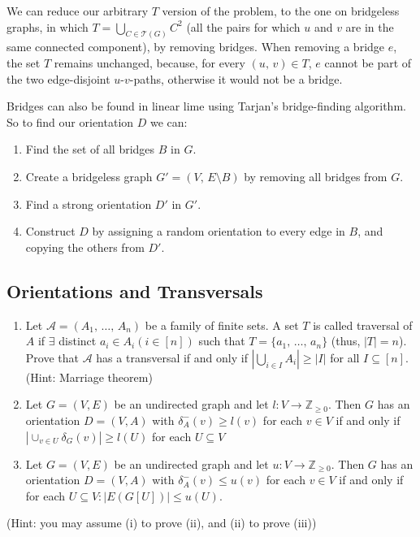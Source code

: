 \documentclass{article}
\newcommand{\Z}{\mathbb{Z}}
\begin{document}
  We can reduce our arbitrary $T$ version of the problem, to the one on bridgeless graphs,
  in which $T = \bigcup_{C \in \mathcal{T}(G)} C^2$ (all the pairs for which $u$ and $v$ are in the same connected component),
  by removing bridges.
  When removing a bridge $e$, the set $T$ remains unchanged,
  because, for every $(u,\, v) \in T$, $e$ cannot be part of the two edge-disjoint $u$-$v$-paths,
  otherwise it would not be a bridge.

  Bridges can also be found in linear lime using Tarjan's bridge-finding algorithm.
  So to find our orientation $D$ we can:
  \begin{enumerate}[itemsep=-1ex]
    \item Find the set of all bridges $B$ in $G$.
    \item Create a bridgeless graph $G' = (V,\, E \setminus B)$ by removing all bridges from $G$.
    \item Find a strong orientation $D'$ in $G'$.
    \item Construct $D$ by assigning a random orientation to every edge in $B$, and copying the others from $D'$.
  \end{enumerate}

  \subsection{Orientations and Transversals}
  \begin{centerframebox}
    \begin{enumerate}[label=(\roman*)]
      \item Let $\mathcal{A} = (A_1,\, \dots,\, A_n)$ be a family of finite sets. A set $T$ is
      called traversal of $A$ if $\exists$ distinct $a_i \in A_i (i \in [n])$ such that $T = \{a_1,\, \dots,\, a_n\}$
      (thus, $|T| = n$). Prove that $\mathcal{A}$ has a transversal if and only if $|\bigcup_{i\in I} A_i| \geq |I|$
      for all $I \subseteq [n]$. (Hint: Marriage theorem)

      \item Let $G = (V, E)$ be an undirected graph and let $l : V \to \Z_{\geq 0}$. Then $G$ has
      an orientation $D = (V, A)$ with $\delta^-_A(v) \geq l(v)$ for each $v \in V$ if and only if
      $|\cup_{v\in U} \delta_G(v)| \geq l(U)$ for each $U \subseteq V$

      \item Let $G = (V, E)$ be an undirected graph and let $u : V \to \Z_{\geq 0}$. Then $G$ has
      an orientation $D = (V, A)$ with $\delta^-_A(v) \leq u(v)$ for each $v \in V$ if and only if for each $U \subseteq V : |E(G[U])| \leq u(U)$.
    \end{enumerate}

    (Hint: you may assume (i) to prove (ii), and (ii) to prove (iii))
  \end{centerframebox}
\end{document}
